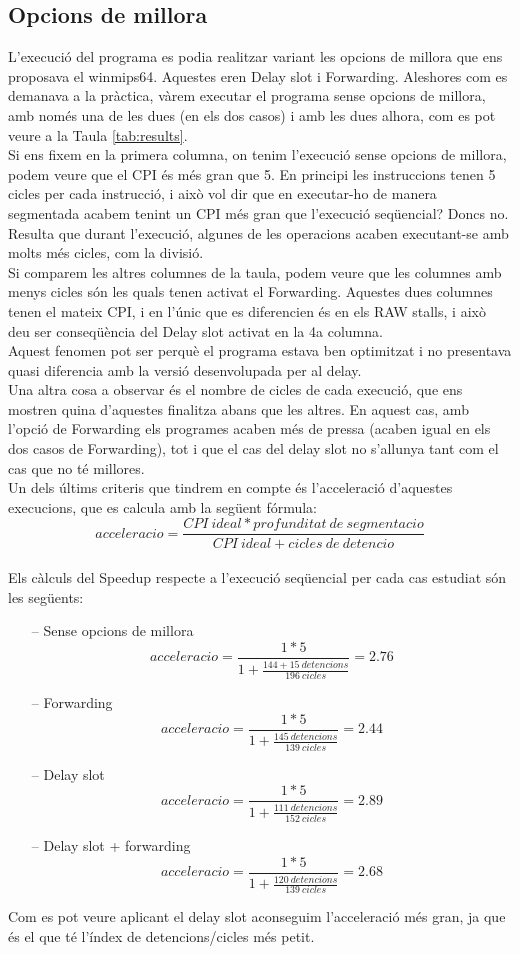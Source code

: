 \documentclass{article}
\begin{document}
\subsection{Opcions de millora}
L'execució del programa es podia realitzar variant les opcions de millora que ens proposava el winmips64. Aquestes eren Delay slot i Forwarding. Aleshores com es demanava a la pràctica, vàrem executar el programa sense opcions de millora, amb només una de les dues (en els dos casos) i amb les dues alhora, com es pot veure a la Taula \ref{tab:results}.\\
Si ens fixem en la primera columna, on tenim l'execució sense opcions de millora, podem veure que el CPI és més gran que 5. En principi les instruccions tenen 5 cicles per cada instrucció, i això vol dir que en executar-ho de manera segmentada acabem tenint un CPI més gran que l'execució seqüencial? Doncs no. Resulta que durant l'execució, algunes de les operacions acaben executant-se amb molts més cicles, com la divisió.\\
Si comparem les altres columnes de la taula, podem veure que les columnes amb menys cicles són les quals tenen activat el Forwarding. Aquestes dues columnes tenen el mateix CPI, i en l'únic que es diferencien és en els RAW stalls, i això deu ser conseqüència del Delay slot activat en la 4a columna.\\
Aquest fenomen pot ser perquè el programa estava ben optimitzat i no presentava quasi diferencia amb la versió desenvolupada per al delay.\\
Una altra cosa a observar és el nombre de cicles de cada execució, que ens mostren quina d'aquestes finalitza abans que les altres. En aquest cas, amb l'opció de Forwarding els programes acaben més de pressa (acaben igual en els dos casos de Forwarding), tot i que el cas del delay slot no s'allunya tant com el cas que no té millores.\\
Un dels últims criteris que tindrem en compte és l'acceleració d'aquestes execucions, que es calcula amb la següent fórmula:\\
$$ acceleracio = \frac{CPI\ ideal * profunditat\ de\ segmentacio}{CPI\ ideal + cicles\ de\ detencio} $$\\
Els càlculs del Speedup respecte a l'execució seqüencial per cada cas estudiat són les següents:
\begin{itemize}
\item[--]{Sense opcions de millora}
$$ acceleracio = \frac{1 * 5}{1 + \frac{144+15\ detencions}{196\ cicles}}=2.76 $$
\item[--]{Forwarding}
$$ acceleracio = \frac{1 * 5}{1 + \frac{145\ detencions}{139\ cicles}}=2.44 $$
\item[--]{Delay slot}
$$ acceleracio = \frac{1 * 5}{1 + \frac{111\ detencions}{152\ cicles}}=2.89 $$
\item[--]{Delay slot + forwarding}
$$ acceleracio = \frac{1 * 5}{1 + \frac{120\ detencions}{139\ cicles}}=2.68 $$
\end{itemize}
Com es pot veure aplicant el delay slot aconseguim l'acceleració més gran, ja que és el que té l'índex de detencions/cicles més petit.
\end{document}
